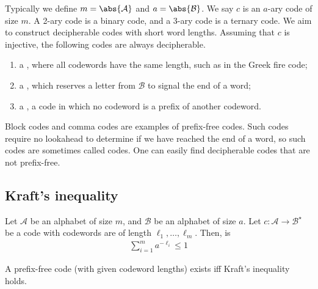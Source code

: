Typically we define $m = \abs{\mathcal A}$ and $a = \abs{\mathcal B}$.
We say $c$ is an $a$-ary code of size $m$.
A 2-ary code is a binary code, and a 3-ary code is a ternary code.
We aim to construct decipherable codes with short word lengths.
Assuming that $c$ is injective, the following codes are always decipherable.
\begin{enumerate}
    \item a , where all codewords have the same length, such as in the Greek fire code;
    \item a , which reserves a letter from $\mathcal B$ to signal the end of a word;
    \item a , a code in which no codeword is a prefix of another codeword.
\end{enumerate}
Block codes and comma codes are examples of prefix-free codes.
Such codes require no lookahead to determine if we have reached the end of a word, so such codes are sometimes called  codes.
One can easily find decipherable codes that are not prefix-free.

\subsection{Kraft's inequality}

\begin{definition}
    Let $\mathcal A$ be an alphabet of size $m$, and $\mathcal B$ be an alphabet of size $a$.
    Let $c \colon \mathcal A \to \mathcal B^\star$ be a code with codewords are of length $\ell_1, \dots, \ell_m$.
    Then,  is
    \begin{align*}
        \sum_{i=1}^m a^{-\ell_i} \leq 1
    \end{align*}
\end{definition}

\begin{theorem}
    A prefix-free code (with given codeword lengths) exists iff Kraft's inequality holds.
\end{theorem}

